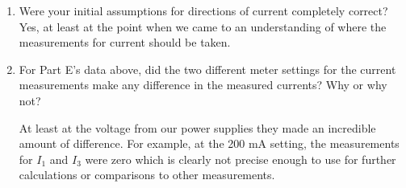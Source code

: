 \begin{enumerate}[1.] %
	\item Were your initial assumptions for directions of current completely correct? \\
	
	Yes, at least at the point when we came to an understanding of where the measurements for current should be taken.
	
	\item For Part E's data above, did the two different meter settings for the current measurements make any difference in the measured currents?  Why or why not?
	
	At least at the voltage from our power supplies they made an incredible amount of difference.  For example, at the 200 mA setting, the measurements for $I_1$ and $I_3$ were zero which is clearly not precise enough to use for further calculations or comparisons to other measurements.
	
\end{enumerate}